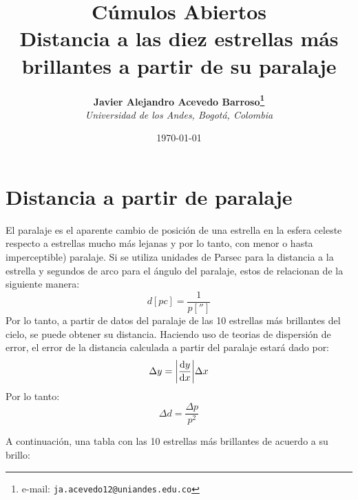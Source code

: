 \documentclass[12pt]{article}
\begin{document}
\title{Cúmulos Abiertos \\ Distancia a las diez estrellas más brillantes a partir de su paralaje}

\author{
\textbf{Javier Alejandro Acevedo Barroso\thanks{e-mail: \texttt{ja.acevedo12@uniandes.edu.co}}}\\
\textit{Universidad de los Andes, Bogotá, Colombia}\\
 }%

\date{\today}
\maketitle %


\normalsize
\newpage



\section{Distancia a partir de paralaje}
El paralaje es el aparente cambio de posición de una estrella en la esfera celeste respecto a estrellas mucho más lejanas y por lo tanto, con menor o hasta imperceptible) paralaje. Si se utiliza unidades de Parsec para la distancia a la estrella y segundos de arco para el ángulo del paralaje, estos de relacionan de la siguiente manera:
\begin{equation}
\label{paralaxToDistance}
d[pc] = \frac{1}{p['']}
\end{equation}
Por lo tanto, a partir de datos del paralaje de las 10 estrellas más brillantes del cielo, se puede obtener su distancia. Haciendo uso de teorias de dispersión de error, el error de la distancia calculada a partir del paralaje estará dado por:
\begin{equation}
\Delta y =\abs{\dv{y}{x}} \Delta x
\end{equation}
Por lo tanto:
\begin{equation}
\Delta d = \frac{\Delta p}{p^2}
\end{equation}

A continuación, una tabla con las 10 estrellas más brillantes de acuerdo a su brillo:
\end{document}

